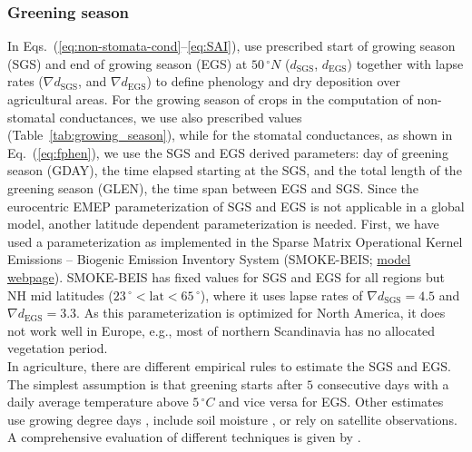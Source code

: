 \documentclass[gmd, manuscript]{copernicus}
\begin{document}
\subsubsection{Greening season}
\label{subsubsec:greening}
In Eqs.~(\ref{eq:non-stomata-cond}--\ref{eq:SAI}), \citet{ACP:Simpson2012} use prescribed start of growing season (SGS) and end of growing season (EGS) at $50\,\unit{^\circ N}$ ($d_\text{SGS}$, $d_\text{EGS}$) together with lapse rates ($\nabla d_\text{SGS}$, and $\nabla d_\text{EGS}$) to define phenology and dry deposition over agricultural areas. For the growing season of crops in the computation of non-stomatal conductances, we use also prescribed values (Table~\ref{tab:growing_season}), while for the stomatal conductances, as shown in Eq.~(\ref{eq:fphen}), we use the SGS and EGS derived parameters: day of greening season (GDAY), the time elapsed starting at the SGS, and the total length of the greening season (GLEN), the time span between EGS and SGS. Since the eurocentric EMEP parameterization of SGS and EGS is not applicable in a global model, another latitude dependent parameterization is needed. First, we have used a parameterization as implemented in the Sparse Matrix Operational Kernel Emissions -- Biogenic Emission Inventory System (SMOKE-BEIS; \href{https://www.epa.gov/air-emissions-modeling/biogenic-emission-inventory-system-beis}{model webpage}). SMOKE-BEIS has fixed values for SGS and EGS for all regions but NH mid latitudes ($23\,\unit{^\circ} < \text{lat} < 65\,\unit{^\circ}$), where it uses lapse rates of $\nabla d_\text{SGS} = 4.5$ and $\nabla d_\text{EGS} = 3.3$. As this parameterization is optimized for North America, it does not work well in Europe, e.g., most of northern Scandinavia has no allocated vegetation period.\\ 

In agriculture, there are different empirical rules to estimate the SGS and EGS. The simplest assumption is that greening starts after $5$ consecutive days with a daily average temperature above $5\,\unit{^\circ C}$ and vice versa for EGS. Other estimates use growing degree days \citep{JC:Levis2004,PO:Fu2014}, include soil moisture \citep{GCB:Fu2014}, or rely on satellite observations. A comprehensive evaluation of different techniques is given by \citet{GCB:Anav2017}.
\end{document}
